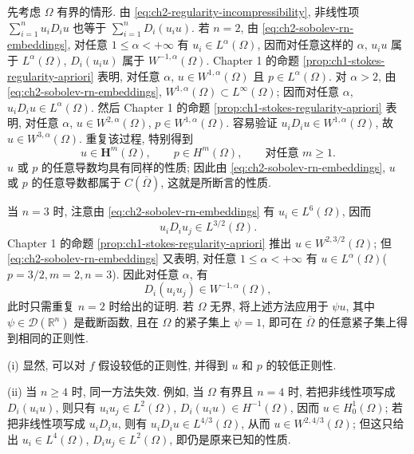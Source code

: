 \begin{Proof}
先考虑 $\Omega$ 有界的情形. 由 \eqref{eq:ch2-regularity-incompressibility}, 非线性项 $\sum_{i=1}^n u_iD_i u$ 也等于 $\sum_{i=1}^nD_i(u_i u)$. 若 $n=2$, 由 \eqref{eq:ch2-sobolev-rn-embeddings}, 对任意 $1\leq\alpha<+\infty$ 有 $u_i\in L^\alpha(\Omega)$, 因而对任意这样的 $\alpha$, $u_i u$ 属于 $L^\alpha(\Omega)$, $D_i(u_i u)$ 属于 $W^{-1,\alpha}(\Omega)$. Chapter 1 的命题 \ref{prop:ch1-stokes-regularity-apriori} 表明, 对任意 $\alpha$, $u\in W^{1,\alpha}(\Omega)$ 且 $p\in L^\alpha(\Omega)$. 对 $\alpha>2$, 由 \eqref{eq:ch2-sobolev-rn-embeddings}, $W^{1,\alpha}(\Omega)\subset L^\infty(\Omega)$; 因而对任意 $\alpha$, $u_iD_iu\in L^\alpha(\Omega)$. 然后 Chapter 1 的命题 \ref{prop:ch1-stokes-regularity-apriori} 表明, 对任意 $\alpha$, $u\in W^{2,\alpha}(\Omega)$, $p\in W^{1,\alpha}(\Omega)$. 容易验证 $u_iD_i u\in W^{1,\alpha}(\Omega)$, 故 $u\in W^{3,\alpha}(\Omega)$. 重复该过程, 特别得到
\begin{equation}
u\in\mathbf H^m(\Omega),
\qquad p\in H^m(\Omega),
\qquad\text{对任意 }m\geq1.
\label{eq:ch2-arbitrary-sobolev-regularity}
\end{equation}
$u$ 或 $p$ 的任意导数均具有同样的性质; 因此由 \eqref{eq:ch2-sobolev-rn-embeddings}, $u$ 或 $p$ 的任意导数都属于 $C(\overline\Omega)$, 这就是所断言的性质.

当 $n=3$ 时, 注意由 \eqref{eq:ch2-sobolev-rn-embeddings} 有 $u_i\in L^6(\Omega)$, 因而
\[
u_iD_i u_j\in L^{3/2}(\Omega).
\]
Chapter 1 的命题 \ref{prop:ch1-stokes-regularity-apriori} 推出 $u\in W^{2,3/2}(\Omega)$; 但 \eqref{eq:ch2-sobolev-rn-embeddings} 又表明, 对任意 $1\leq\alpha<+\infty$ 有 $u\in L^\alpha(\Omega)$($p=3/2,m=2,n=3$). 因此对任意 $\alpha$, 有
\[
D_i(u_i u_j)\in W^{-1,\alpha}(\Omega),
\]
此时只需重复 $n=2$ 时给出的证明. 若 $\Omega$ 无界, 将上述方法应用于 $\psi u$, 其中 $\psi\in\mathcal D(\mathbb R^n)$ 是截断函数, 且在 $\Omega$ 的紧子集上 $\psi=1$, 即可在 $\overline\Omega$ 的任意紧子集上得到相同的正则性.
\end{Proof}

\begin{Remark}
\label{rem:ch2-solution-regularity}
(i) 显然, 可以对 $f$ 假设较低的正则性, 并得到 $u$ 和 $p$ 的较低正则性.

(ii) 当 $n\geq4$ 时, 同一方法失效. 例如, 当 $\Omega$ 有界且 $n=4$ 时, 若把非线性项写成 $D_i(u_i u)$, 则只有 $u_i u_j\in L^2(\Omega)$, $D_i(u_i u)\in H^{-1}(\Omega)$, 因而 $u\in H_0^1(\Omega)$; 若把非线性项写成 $u_iD_i u$, 则有 $u_iD_i u\in L^{4/3}(\Omega)$, 从而 $u\in W^{2,4/3}(\Omega)$; 但这只给出 $u_i\in L^4(\Omega)$, $D_i u_j\in L^2(\Omega)$, 即仍是原来已知的性质.
\end{Remark}


